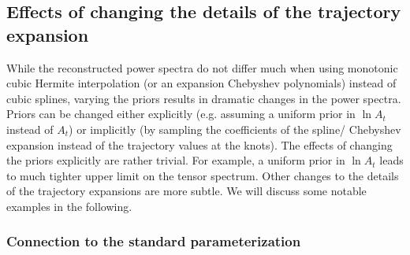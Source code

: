 \documentclass[a4paper,11pt]{article}
\begin{document}
\subsection{Effects of changing the details of the trajectory expansion}

While the reconstructed power spectra do not differ much when using
monotonic cubic Hermite interpolation (or an expansion Chebyshev
polynomials) instead of cubic splines, varying the priors results in
dramatic changes in the power spectra. Priors can be changed either
explicitly (e.g. assuming a uniform prior in $\ln A_t$ instead of
$A_t$) or implicitly (by sampling the coefficients of the spline/
Chebyshev expansion instead of the trajectory values at the
knots). The effects of changing the priors explicitly are rather
trivial. For example, a uniform prior in $\ln A_t$ leads to much
tighter upper limit on the tensor spectrum.  Other changes to the
details of the trajectory expansions are more subtle. We will discuss
some notable examples in the following.

\subsubsection{Connection to the standard parameterization}
\end{document}
